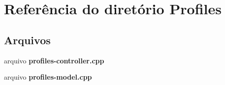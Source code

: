\section{Referência do diretório Profiles}
\label{dir_b78a83804ceca9d97dd96c600b254712}
\subsection*{Arquivos}
\begin{DoxyCompactItemize}
\item 
arquivo {\bf profiles-\/controller.\+cpp}
\item 
arquivo {\bf profiles-\/model.\+cpp}
\end{DoxyCompactItemize}
